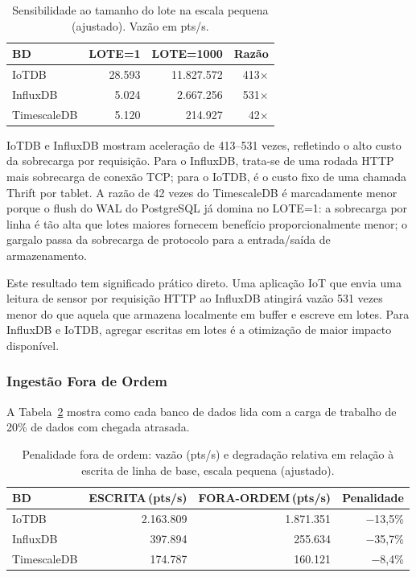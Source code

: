 \begin{table}[ht]
  \centering
  \caption{Sensibilidade ao tamanho do lote na escala pequena (ajustado). Vazão em pts/s.}
  \label{tab:batch}
  \begin{tabular}{lrrr}
    \hline
    \textbf{BD} & \textbf{LOTE=1} & \textbf{LOTE=1000} & \textbf{Razão} \\
    \hline
    IoTDB       &  28.593 & 11.827.572 & 413$\times$ \\
    InfluxDB    &   5.024 &  2.667.256 & 531$\times$ \\
    TimescaleDB &   5.120 &    214.927 &  42$\times$ \\
    \hline
  \end{tabular}
\end{table}

IoTDB e InfluxDB mostram aceleração de 413--531 vezes, refletindo o alto custo da sobrecarga
por requisição. Para o InfluxDB, trata-se de uma rodada HTTP mais sobrecarga de conexão TCP;
para o IoTDB, é o custo fixo de uma chamada Thrift por tablet. A razão de 42 vezes do
TimescaleDB é marcadamente menor porque o flush do WAL do PostgreSQL já domina no LOTE=1:
a sobrecarga por linha é tão alta que lotes maiores fornecem benefício proporcionalmente menor;
o gargalo passa da sobrecarga de protocolo para a entrada/saída de armazenamento.

Este resultado tem significado prático direto. Uma aplicação IoT que envia uma leitura de
sensor por requisição HTTP ao InfluxDB atingirá vazão 531 vezes menor do que aquela que
armazena localmente em buffer e escreve em lotes. Para InfluxDB e IoTDB, agregar escritas em
lotes é a otimização de maior impacto disponível.

\subsubsection{Ingestão Fora de Ordem}

A Tabela~\ref{tab:ooo} mostra como cada banco de dados lida com a carga de trabalho de 20\%
de dados com chegada atrasada.

\begin{table}[t]
  \centering
  \caption{Penalidade fora de ordem: vazão (pts/s) e degradação relativa em relação à escrita
  de linha de base, escala pequena (ajustado).}
  \label{tab:ooo}
  \begin{tabular}{lrrr}
    \hline
    \textbf{BD} & \textbf{ESCRITA\,(pts/s)} & \textbf{FORA-ORDEM\,(pts/s)} & \textbf{Penalidade} \\
    \hline
    IoTDB       & 2.163.809 & 1.871.351 & $-$13,5\% \\
    InfluxDB    &   397.894 &   255.634 & $-$35,7\% \\
    TimescaleDB &   174.787 &   160.121 & $-$8,4\% \\
    \hline
  \end{tabular}
\end{table}

